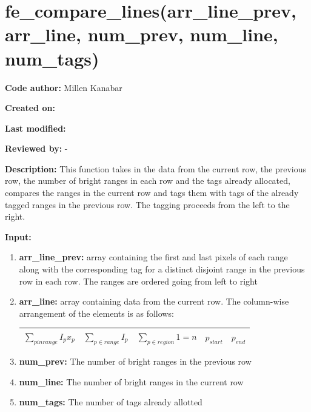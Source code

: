 \documentclass[a4paper, oneside,11pt]{article}
\begin{document}
    
\section*{fe\_compare\_lines(arr\_line\_prev, arr\_line, num\_prev, num\_line, num\_tags)}
\textbf{Code author:} Millen Kanabar


\textbf{Created on:}


\textbf{Last modified:}


\textbf{Reviewed by:} -


\textbf{Description:}
    This function takes in the data from the current row, the previous row, the number of bright ranges in each row and the tags already allocated, compares the ranges in the current row and tags them with tags of the already tagged ranges in the previous row.
    The tagging proceeds from the left to the right.
    
\textbf{Input:}
\begin{enumerate}
    \item \textbf{arr\_line\_prev:} array containing the first and last pixels of each range along with the corresponding tag for a distinct disjoint range in the previous row in each row. The ranges are ordered going from left to right
    \item \textbf{arr\_line:} array containing data from the current row. The column-wise arrangement of the elements is as follows:
    
    \begin{tabular}{|c|c|c|c|c|}
        \hline
        $ \sum_{p in range} I_p x_p $ & $ \sum_{p \in range} I_p $  & $\sum_{p \in region} 1 = n $  & $ p_{start} $  & $ p_{end} $ \\
        \hline
    \end{tabular}

    \item \textbf{num\_prev:} The number of bright ranges in the previous row
    \item \textbf{num\_line:} The number of bright ranges in the current row
    \item \textbf{num\_tags:} The number of tags already allotted
\end{enumerate}
\end{document}
